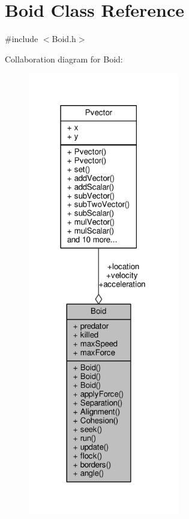 \hypertarget{class_boid}{}\section{Boid Class Reference}
\label{class_boid}


{\ttfamily \#include $<$Boid.\+h$>$}



Collaboration diagram for Boid\+:
\nopagebreak
\begin{figure}[H]
\begin{center}
\leavevmode
\includegraphics[height=550pt]{class_boid__coll__graph}
\end{center}
\end{figure}
